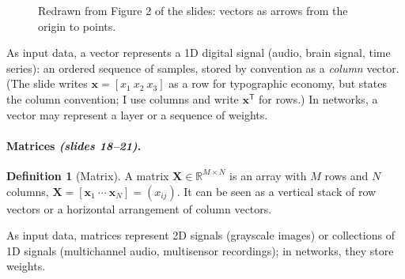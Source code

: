 \documentclass[11pt,a4paper]{article}
\newcommand{\R}{\mathbb{R}}
\newcommand{\T}{^{\mathsf{T}}}
\newcommand{\slides}[1]{\texorpdfstring{\emph{(slides #1)}}{(slides #1)}}
\theoremstyle{definition}
\newtheorem{definition}{Definition}[section]
\theoremstyle{plain}
\begin{document}
\begin{figure}[ht]
\centering
{}
\caption{Redrawn from Figure 2 of the slides: vectors as arrows from the origin to points.}
\end{figure}

As input data, a vector represents a 1D digital signal (audio, brain signal, time series): an ordered sequence of samples, stored by convention as a \emph{column} vector. (The slide writes $\mathbf x=[x_1\ x_2\ x_3]$ as a row for typographic economy, but states the column convention; I use columns and write $\mathbf x\T$ for rows.) In networks, a vector may represent a layer or a sequence of weights.

\paragraph{Matrices \slides{18--21}.}
\begin{definition}[Matrix]
A matrix $\mathbf X\in\R^{M\times N}$ is an array with $M$ rows and $N$ columns, $\mathbf X=[\mathbf x_1\ \cdots\ \mathbf x_N]=(x_{ij})$. It can be seen as a vertical stack of row vectors or a horizontal arrangement of column vectors.
\end{definition}

As input data, matrices represent 2D signals (grayscale images) or collections of 1D signals (multichannel audio, multisensor recordings); in networks, they store weights.
\end{document}

